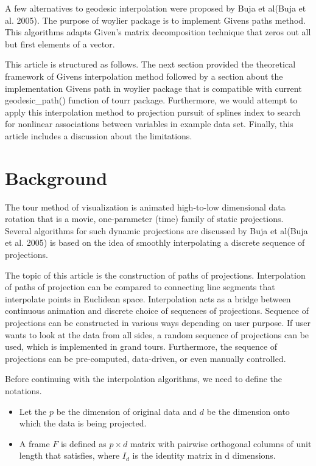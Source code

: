 A few alternatives to geodesic interpolation were proposed by Buja et al(Buja et al. 2005). The purpose of woylier package is to implement Givens paths method. This algorithms adapts Given's matrix decomposition technique that zeros out all but first elements of a vector.

This article is structured as follows. The next section provided the theoretical framework of Givens interpolation method followed by a section about the implementation Givens path in woylier package that is compatible with current geodesic\_path() function of tourr package. Furthermore, we would attempt to apply this interpolation method to projection pursuit of splines index to search for nonlinear associations between variables in example data set. Finally, this article includes a discussion about the limitations.

\hypertarget{background}{%
\section{Background}\label{background}}

The tour method of visualization is animated high-to-low dimensional data rotation that is a movie, one-parameter (time) family of static projections. Several algorithms for such dynamic projections are discussed by Buja et al(Buja et al. 2005) is based on the idea of smoothly interpolating a discrete sequence of projections.

The topic of this article is the construction of paths of projections. Interpolation of paths of projection can be compared to connecting line segments that interpolate points in Euclidean space. Interpolation acts as a bridge between continuous animation and discrete choice of sequences of projections. Sequence of projections can be constructed in various ways depending on user purpose. If user wants to look at the data from all sides, a random sequence of projections can be used, which is implemented in grand tours. Furthermore, the sequence of projections can be pre-computed, data-driven, or even manually controlled.

Before continuing with the interpolation algorithms, we need to define the notations.

\begin{itemize}
\item
  Let the \(p\) be the dimension of original data and \(d\) be the dimension onto which the data is being projected.
\item
  A frame \(F\) is defined as \(p\times d\) matrix with pairwise orthogonal columns of unit length that satisfies, where \(I_d\) is the identity matrix in d dimensions.
\end{itemize}

